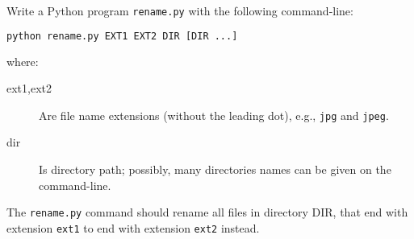 \documentclass[english,serif,mathserif,xcolor=pdftex,dvipsnames,table]{beamer}
\begin{document}
\begin{frame}[fragile]
  \begin{exercise}
    Write a Python program \texttt{rename.py} with the following
    command-line:
\begin{lstlisting}[language=sh]
python rename.py EXT1 EXT2 DIR [DIR ...]
\end{lstlisting}
    where:
    \begin{description}
    \item[ext1,ext2] Are file name extensions (without the leading
      dot), e.g., \texttt{jpg} and \texttt{jpeg}.
    \item[dir] Is directory path; possibly, many directories names can
      be given on the command-line.
    \end{description}

    The \texttt{rename.py} command should rename all files in
    directory DIR, that end with extension \texttt{ext1} to end with
    extension \texttt{ext2} instead.
  \end{exercise}
\end{frame}
\end{document}
